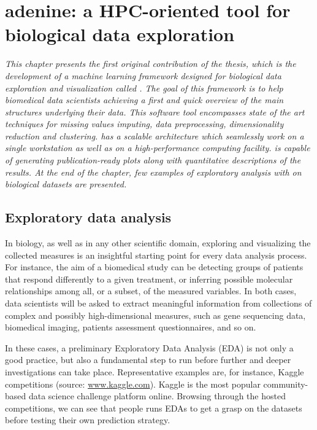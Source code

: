 
\chapter{{\sc adenine}: a HPC-oriented tool for biological data exploration} \label{chap:adenine}

\begin{displayquote}
\textit{This chapter presents the first original contribution of the thesis, which is the 	 development of a machine learning framework designed for biological data exploration and visualization called \ade.
The goal of this framework is to help biomedical data scientists achieving a first and quick overview of the main structures underlying their data.
This software tool encompasses state of the art techniques for missing values imputing, data preprocessing, dimensionality reduction and clustering.
\ade has a scalable architecture which seamlessly work on a single workstation as well as on a high-performance computing facility.
\ade is capable of generating publication-ready plots along with quantitative descriptions of the results.
At the end of the chapter, few examples of exploratory analysis with \ade on biological datasets are presented.}
\end{displayquote}


\section{Exploratory data analysis} \label{sec:data_exploration}
In biology, as well as in any other scientific domain, exploring and visualizing the collected measures is an insightful starting point for every data analysis process.
For instance, the aim of a biomedical study can be detecting groups of patients that respond differently to a given treatment, or inferring possible molecular relationships among all, or a subset, of the measured variables.
In both cases, data scientists will be asked to extract meaningful information from collections of complex and possibly high-dimensional measures, such as gene sequencing data, biomedical imaging, patients assessment questionnaires, and so on.

In these cases, a preliminary Exploratory Data Analysis (\ac{EDA}) is not only a good practice, but also a fundamental step to run before further and deeper investigations can take place.
Representative examples are, for instance, Kaggle competitions (source: \url{www.kaggle.com}). Kaggle is the most popular community-based data science challenge platform online. Browsing through the hosted competitions, we can see that people runs EDAs to get a grasp on the datasets before testing their own prediction strategy.

